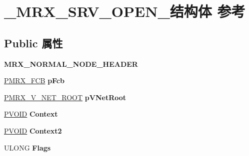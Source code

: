 \hypertarget{struct___m_r_x___s_r_v___o_p_e_n__}{}\section{\+\_\+\+M\+R\+X\+\_\+\+S\+R\+V\+\_\+\+O\+P\+E\+N\+\_\+结构体 参考}
\label{struct___m_r_x___s_r_v___o_p_e_n__}
\subsection*{Public 属性}
\begin{DoxyCompactItemize}
\item 
\mbox{\label{struct___m_r_x___s_r_v___o_p_e_n___a3c2d557972fdcd5f63b1cbe9348ab1d0}} 
{\bfseries M\+R\+X\+\_\+\+N\+O\+R\+M\+A\+L\+\_\+\+N\+O\+D\+E\+\_\+\+H\+E\+A\+D\+ER}
\item 
\mbox{\label{struct___m_r_x___s_r_v___o_p_e_n___a8aa83e8ffa2af2a127fdd7d4ae14b0b8}} 
\hyperlink{struct___m_r_x___f_c_b__}{P\+M\+R\+X\+\_\+\+F\+CB} {\bfseries p\+Fcb}
\item 
\mbox{\label{struct___m_r_x___s_r_v___o_p_e_n___a737bb447814641cf9c680be43798c367}} 
\hyperlink{struct___m_r_x___v___n_e_t___r_o_o_t__}{P\+M\+R\+X\+\_\+\+V\+\_\+\+N\+E\+T\+\_\+\+R\+O\+OT} {\bfseries p\+V\+Net\+Root}
\item 
\mbox{\label{struct___m_r_x___s_r_v___o_p_e_n___a7e02797bcea95edb3f3a136965ef062c}} 
\hyperlink{interfacevoid}{P\+V\+O\+ID} {\bfseries Context}
\item 
\mbox{\label{struct___m_r_x___s_r_v___o_p_e_n___a09c2bf1e02011bfc9f9f66bf6136ba84}} 
\hyperlink{interfacevoid}{P\+V\+O\+ID} {\bfseries Context2}
\item 
\mbox{\label{struct___m_r_x___s_r_v___o_p_e_n___a35a022da6c960e654bc391d7cabed2e6}} 
U\+L\+O\+NG {\bfseries Flags}
\item 
\mbox{\label{struct___m_r_x___s_r_v___o_p_e_n___aba680960758e56344f9d84ca776a0c53}} 

\end{DoxyCompactItemize}
